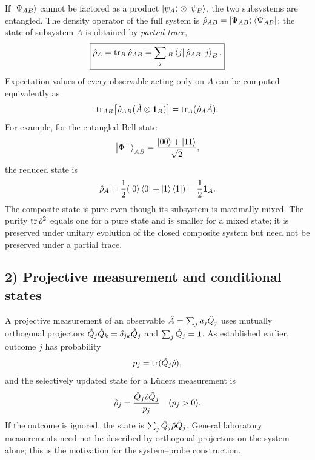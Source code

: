 If $\left|\Psi_{AB}\right\rangle$ cannot be factored as a product $\left|\psi_A\right\rangle\otimes\left|\psi_B\right\rangle$, the two subsystems are entangled. The density operator of the full system is $\hat{\rho}_{AB}=\left|\Psi_{AB}\right\rangle\left\langle\Psi_{AB}\right|$; the state of subsystem $A$ is obtained by \emph{partial trace},
\begin{equation}
\boxed{\hat{\rho}_A=\operatorname{tr}_B\hat{\rho}_{AB}
 =\sum_j{}_B\left\langle j\right|\hat{\rho}_{AB}\left|j\right\rangle_B.}
\end{equation}
Expectation values of every observable acting only on $A$ can be computed equivalently as
\begin{equation}
\operatorname{tr}_{AB}\bigl[\hat{\rho}_{AB}(\hat{A}\otimes\mathbf1_B)\bigr]
 =\operatorname{tr}_A(\hat{\rho}_A\hat{A}).
\end{equation}
For example, for the entangled Bell state
\begin{equation}
\left|\Phi^+\right\rangle_{AB}=\frac{\left|00\right\rangle+\left|11\right\rangle}{\sqrt2},
\end{equation}
the reduced state is
\begin{equation}
\hat{\rho}_A=\frac12(\left|0\right\rangle\left\langle0\right|+\left|1\right\rangle\left\langle1\right|)=\frac12\mathbf1_A.
\end{equation}
The composite state is pure even though its subsystem is maximally mixed. The purity $\operatorname{tr}\hat{\rho}^2$ equals one for a pure state and is smaller for a mixed state; it is preserved under unitary evolution of the closed composite system but need not be preserved under a partial trace.



\subsection*{2) Projective measurement and conditional states}

A projective measurement of an observable $\hat{A}=\sum_j a_j\hat{Q}_j$ uses mutually orthogonal projectors $\hat{Q}_j\hat{Q}_k=\delta_{jk}\hat{Q}_j$ and $\sum_j\hat{Q}_j=\mathbf1$. As established earlier, outcome $j$ has probability
\begin{equation}
p_j=\operatorname{tr}(\hat{Q}_j\hat{\rho}),
\end{equation}
and the selectively updated state for a L\"uders measurement is
\begin{equation}
\hat{\rho}_j=\frac{\hat{Q}_j\hat{\rho}\hat{Q}_j}{p_j}\quad(p_j>0).
\end{equation}
If the outcome is ignored, the state is $\sum_j\hat{Q}_j\hat{\rho}\hat{Q}_j$. General laboratory measurements need not be described by orthogonal projectors on the system alone; this is the motivation for the system--probe construction.

